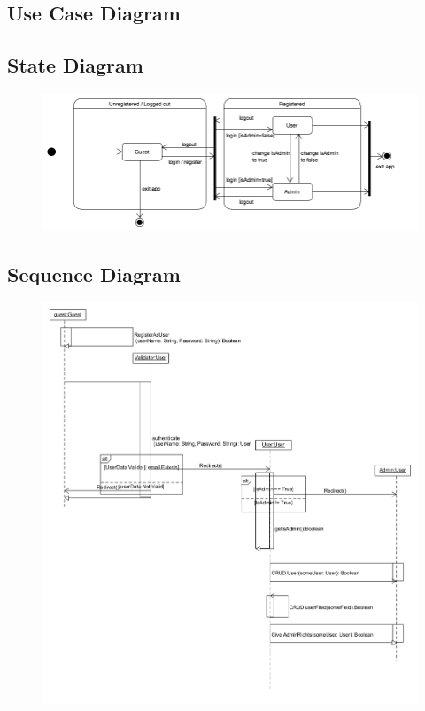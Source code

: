 \subsection{Use Case Diagram}

\subsection{State Diagram}

\begin{figure}[ht]
	\includegraphics[width=\textwidth]{User_Management/User Management State Diagram.png}
\end{figure}

\subsection{Sequence Diagram}

\begin{figure}[ht]
	\includegraphics[width=\textwidth]{User_Management/Sequence_Diagram_User_Management.png}
\end{figure}

